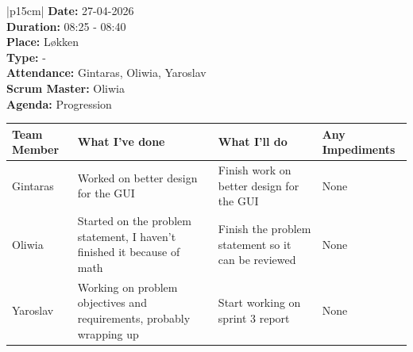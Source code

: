 \begin{table}[H]
    \centering
    \begin{tabular}{|p{15cm}|}   
        \hline
        \textbf{Date:}  27-04-2026 \\
        \textbf{Duration:} 08:25 - 08:40 \\
        \textbf{Place:}  Løkken \\
        \textbf{Type:}  - \\
        \textbf{Attendance:} Gintaras, Oliwia, Yaroslav \\
        \textbf{Scrum Master:}  Oliwia \\
        \textbf{Agenda:} Progression
        \begin{table}[H]
            \begin{tabular}{|p{1.75cm}|p{4cm}|p{4cm}|p{4cm}|}
                \hline
                \cellcolor[HTML]{BFBFBF}  \textbf{Team Member} & \cellcolor[HTML]{BFBFBF}  \textbf{What I've done} & \cellcolor[HTML]{BFBFBF}  \textbf{What I'll do} & \cellcolor[HTML]{BFBFBF}  \textbf{Any Impediments}\\
                \hline
                \cellcolor[HTML]{d4d4d4} Gintaras & Worked on better design for the GUI & Finish work on better design for the GUI & None \\
                \hline
                \cellcolor[HTML]{d4d4d4} Oliwia & Started on the problem statement, I haven't finished it because of math & Finish the problem statement so it can be reviewed & None \\
                \hline
                \cellcolor[HTML]{d4d4d4} Yaroslav & Working on problem objectives and requirements, probably wrapping up & Start working on sprint 3 report & None \\
                \hline
            \end{tabular}
        \end{table}
         \\
        \hline
    \end{tabular}
\end{table}

